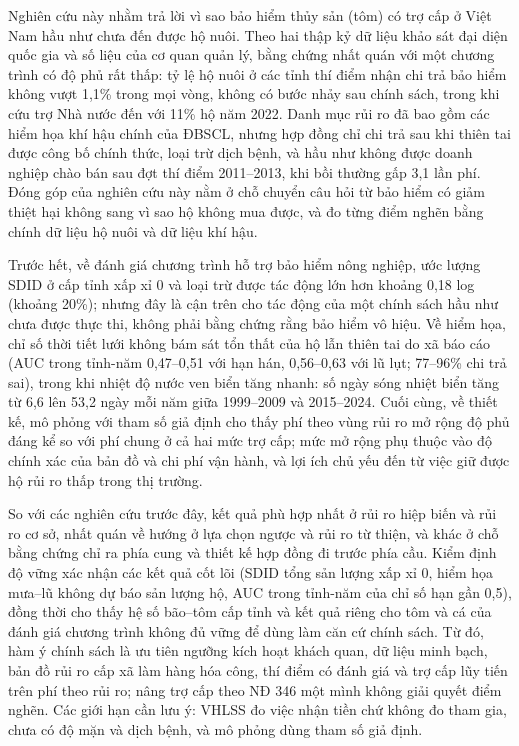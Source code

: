 \documentclass[12pt,a4paper]{article}
\begin{document}
Nghiên cứu này nhằm trả lời vì sao bảo hiểm thủy sản (tôm) có trợ cấp ở Việt Nam hầu như chưa đến được hộ nuôi. Theo hai thập kỷ dữ liệu khảo sát đại diện quốc gia và số liệu của cơ quan quản lý, bằng chứng nhất quán với một chương trình có độ phủ rất thấp: tỷ lệ hộ nuôi ở các tỉnh thí điểm nhận chi trả bảo hiểm không vượt 1,1\% trong mọi vòng, không có bước nhảy sau chính sách, trong khi cứu trợ Nhà nước đến với 11\% hộ năm 2022. Danh mục rủi ro đã bao gồm các hiểm họa khí hậu chính của ĐBSCL, nhưng hợp đồng chỉ chi trả sau khi thiên tai được công bố chính thức, loại trừ dịch bệnh, và hầu như không được doanh nghiệp chào bán sau đợt thí điểm 2011--2013, khi bồi thường gấp 3,1 lần phí. Đóng góp của nghiên cứu này nằm ở chỗ chuyển câu hỏi từ bảo hiểm có giảm thiệt hại không sang vì sao hộ không mua được, và đo từng điểm nghẽn bằng chính dữ liệu hộ nuôi và dữ liệu khí hậu.

Trước hết, về đánh giá chương trình hỗ trợ bảo hiểm nông nghiệp, ước lượng SDID ở cấp tỉnh xấp xỉ 0 và loại trừ được tác động lớn hơn khoảng 0,18 log (khoảng 20\%); nhưng đây là cận trên cho tác động của một chính sách hầu như chưa được thực thi, không phải bằng chứng rằng bảo hiểm vô hiệu. Về hiểm họa, chỉ số thời tiết lưới không bám sát tổn thất của hộ lẫn thiên tai do xã báo cáo (AUC trong tỉnh-năm 0,47--0,51 với hạn hán, 0,56--0,63 với lũ lụt; 77--96\% chi trả sai), trong khi nhiệt độ nước ven biển tăng nhanh: số ngày sóng nhiệt biển tăng từ 6,6 lên 53,2 ngày mỗi năm giữa 1999--2009 và 2015--2024. Cuối cùng, về thiết kế, mô phỏng với tham số giả định cho thấy phí theo vùng rủi ro mở rộng độ phủ đáng kể so với phí chung ở cả hai mức trợ cấp; mức mở rộng phụ thuộc vào độ chính xác của bản đồ và chi phí vận hành, và lợi ích chủ yếu đến từ việc giữ được hộ rủi ro thấp trong thị trường.

So với các nghiên cứu trước đây, kết quả phù hợp nhất ở rủi ro hiệp biến và rủi ro cơ sở, nhất quán về hướng ở lựa chọn ngược và rủi ro từ thiện, và khác ở chỗ bằng chứng chỉ ra phía cung và thiết kế hợp đồng đi trước phía cầu. Kiểm định độ vững xác nhận các kết quả cốt lõi (SDID tổng sản lượng xấp xỉ 0, hiểm họa mưa--lũ không dự báo sản lượng hộ, AUC trong tỉnh-năm của chỉ số hạn gần 0,5), đồng thời cho thấy hệ số bão--tôm cấp tỉnh và kết quả riêng cho tôm và cá của đánh giá chương trình không đủ vững để dùng làm căn cứ chính sách. Từ đó, hàm ý chính sách là ưu tiên ngưỡng kích hoạt khách quan, dữ liệu minh bạch, bản đồ rủi ro cấp xã làm hàng hóa công, thí điểm có đánh giá và trợ cấp lũy tiến trên phí theo rủi ro; nâng trợ cấp theo NĐ 346 một mình không giải quyết điểm nghẽn. Các giới hạn cần lưu ý: VHLSS đo việc nhận tiền chứ không đo tham gia, chưa có độ mặn và dịch bệnh, và mô phỏng dùng tham số giả định. 
\end{document}
